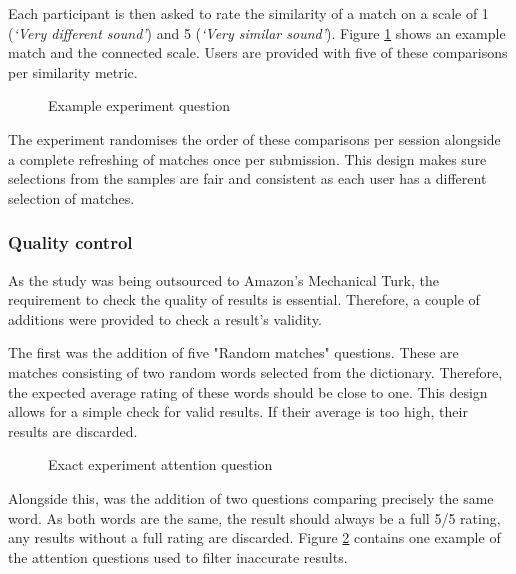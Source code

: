 Each participant is then asked to rate the similarity of a match on a scale of 1 (\textit{`Very different sound'}) and 5 (\textit{`Very similar sound'}). Figure \ref{fig:phoneticMatch} shows an example match and the connected scale. Users are provided with five of these comparisons per similarity metric.

\begin{figure}[h!]
    \centering
    \caption{Example experiment question}
    \label{fig:phoneticMatch}
\end{figure}

The experiment randomises the order of these comparisons per session alongside a complete refreshing of matches once per submission. This design makes sure selections from the samples are fair and consistent as each user has a different selection of matches.

\subsubsection{Quality control}
\label{sec:exp1_qualitycontrol}
As the study was being outsourced to Amazon's Mechanical Turk, the requirement to check the quality of results is essential. Therefore, a couple of additions were provided to check a result's validity.

The first was the addition of five "Random matches" questions. These are matches consisting of two random words selected from the dictionary. Therefore, the expected average rating of these words should be close to one. This design allows for a simple check for valid results. If their average is too high, their results are discarded.

\begin{figure}[h!]
    \centering
    \caption{Exact experiment attention question}
    \label{fig:exactMatch}
\end{figure}

Alongside this, was the addition of two questions comparing precisely the same word. As both words are the same, the result should always be a full 5/5 rating, any results without a full rating are discarded. Figure \ref{fig:exactMatch} contains one example of the attention questions used to filter inaccurate results.


